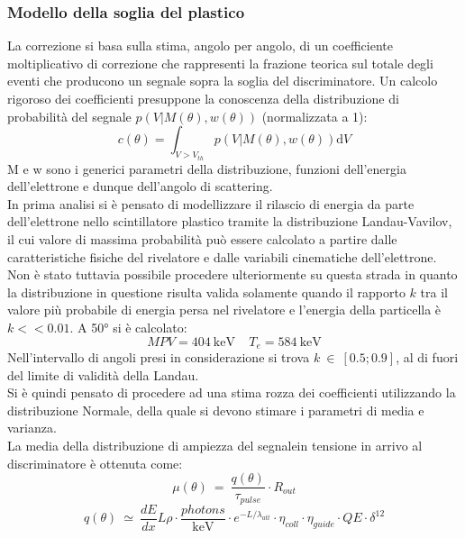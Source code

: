 \documentclass[8pt]{extarticle}
\begin{document}
\subsubsection{Modello della soglia del plastico} \label{subsubsec:corr_soglia}
La correzione si basa sulla stima, angolo per angolo, di un coefficiente moltiplicativo di correzione che rappresenti la frazione teorica sul totale degli eventi che producono un segnale sopra la soglia del discriminatore. Un calcolo rigoroso dei coefficienti presuppone la conoscenza della distribuzione di probabilità del segnale $p(V|M(\theta),w(\theta))$ (normalizzata a 1):
\begin{equation}
c(\theta)=\int_{V>V_{th}} \! p(V|M(\theta),w(\theta)) \mathrm{d}V
\end{equation}
M e w sono i generici parametri della distribuzione, funzioni dell'energia dell'elettrone e dunque dell'angolo di scattering.\\
In prima analisi si è pensato di modellizzare il rilascio di energia da parte dell'elettrone nello scintillatore plastico tramite la distribuzione Landau-Vavilov, il cui valore di massima probabilità può essere calcolato a partire dalle caratteristiche fisiche del rivelatore e dalle variabili cinematiche dell'elettrone. Non è stato tuttavia possibile procedere ulteriormente su questa strada in quanto la distribuzione in questione risulta valida solamente quando il rapporto $k$ tra il valore più probabile di energia persa nel rivelatore e l'energia della particella è $k<<0.01$. A 50° si è calcolato:
\begin{equation}
MPV =  404\ \mathrm{keV} \ \ \ \ \ T_e  =  584\ \mathrm{keV}
\end{equation}
Nell'intervallo di angoli presi in considerazione si trova $k \ \in \ [0.5;0.9]$, al di fuori del limite di validità della Landau.\\
Si è quindi pensato di procedere ad una stima rozza dei coefficienti utilizzando la distribuzione Normale, della quale si devono stimare i parametri di media e varianza.\\
La media della distribuzione di ampiezza del segnalein tensione in arrivo al discriminatore è ottenuta come:
\begin{equation}
\mu(\theta)\ = \ \frac{q(\theta)}{\tau_{pulse}}\cdot R_{out} \nonumber
\end{equation}
\begin{equation}
q(\theta)\ \simeq \ \frac{dE}{dx}L\rho\cdot \frac{photons}{\mathrm{keV}}\cdot e^{-L/\lambda_{att}} \cdot \eta_{coll}\cdot \eta_{guide}\cdot QE \cdot \delta^ {12}  \nonumber
\end{equation}
\end{document}
